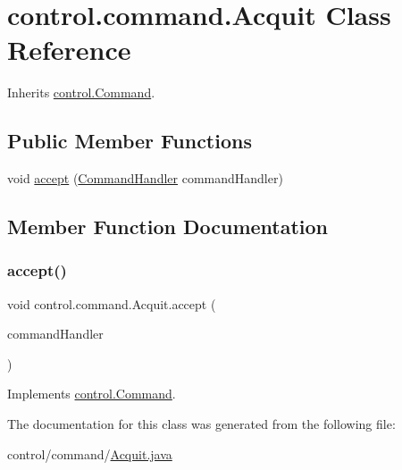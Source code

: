\hypertarget{classcontrol_1_1command_1_1_acquit}{}\section{control.\+command.\+Acquit Class Reference}
\label{classcontrol_1_1command_1_1_acquit}


Inherits \mbox{\hyperlink{interfacecontrol_1_1_command}{control.\+Command}}.

\subsection*{Public Member Functions}
\begin{DoxyCompactItemize}
\item 
void \mbox{\hyperlink{classcontrol_1_1command_1_1_acquit_a9b0f50417f8148f36c8afed609bdd78b}{accept}} (\mbox{\hyperlink{interfacecontrol_1_1_command_handler}{Command\+Handler}} command\+Handler)
\end{DoxyCompactItemize}


\subsection{Member Function Documentation}
\mbox{\label{classcontrol_1_1command_1_1_acquit_a9b0f50417f8148f36c8afed609bdd78b}} 
\subsubsection{\texorpdfstring{accept()}{accept()}}
{\footnotesize\ttfamily void control.\+command.\+Acquit.\+accept (\begin{DoxyParamCaption}\item[{\mbox{\hyperlink{interfacecontrol_1_1_command_handler}{Command\+Handler}}}]{command\+Handler }\end{DoxyParamCaption})}



Implements \mbox{\hyperlink{interfacecontrol_1_1_command_ab81fb31e9d98dfbfbfb7026a5bc823a6}{control.\+Command}}.



The documentation for this class was generated from the following file\+:\begin{DoxyCompactItemize}
\item 
control/command/\mbox{\hyperlink{_acquit_8java}{Acquit.\+java}}\end{DoxyCompactItemize}
